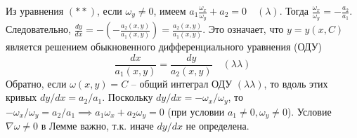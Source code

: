\documentclass[12pt, a4paper]{article}
\begin{document}



Из уравнения $(**)$, если $\omega_y \neq 0$, имеем $a_1 \frac{\omega_x}{\omega_y} + a_2 = 0 \quad (\lambda)$.
Тогда $\frac{\omega_x}{\omega_y} = -\frac{a_2}{a_1}$.
Следовательно, $\frac{dy}{dx} = - \left(-\frac{a_2(x,y)}{a_1(x,y)}\right) = \frac{a_2(x,y)}{a_1(x,y)}$.
Это означает, что $y=y(x,C)$ является решением обыкновенного дифференциального уравнения (ОДУ)
\[ \frac{dx}{a_1(x,y)} = \frac{dy}{a_2(x,y)} \quad (\lambda\lambda) \]
Обратно, если $\omega(x,y)=C$ -- общий интеграл ОДУ $(\lambda\lambda)$, то вдоль этих кривых $dy/dx = a_2/a_1$.
Поскольку $dy/dx = -\omega_x/\omega_y$, то $-\omega_x/\omega_y = a_2/a_1 \implies a_1\omega_x + a_2\omega_y = 0$ (при условии $a_1 \neq 0, \omega_y \neq 0$).
Условие $\nabla \omega \neq 0$ в Лемме важно, т.к. иначе $dy/dx$ не определена.
\end{document}

